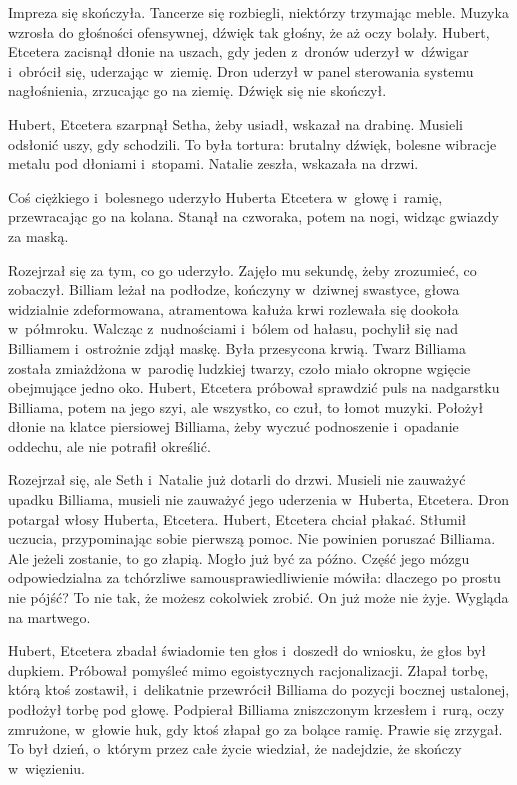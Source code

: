 \documentclass[oneside,polish,11pt,sfheadings]{mwbk}
\begin{document}
Impreza się skończyła. Tancerze się rozbiegli, niektórzy trzymając
meble. Muzyka wzrosła do głośności ofensywnej, dźwięk tak głośny, że aż
oczy bolały. Hubert, Etcetera zacisnął dłonie na uszach, gdy jeden z~dronów uderzył w~dźwigar i~obrócił się, uderzając w~ziemię. Dron uderzył
w panel sterowania systemu nagłośnienia, zrzucając go na ziemię. Dźwięk
się nie skończył.

Hubert, Etcetera szarpnął Setha, żeby usiadł, wskazał na drabinę.
Musieli odsłonić uszy, gdy schodzili. To była tortura: brutalny dźwięk,
bolesne wibracje metalu pod dłoniami i~stopami. Natalie zeszła, wskazała
na drzwi.

Coś ciężkiego i~bolesnego uderzyło Huberta Etcetera w~głowę i~ramię,
przewracając go na kolana. Stanął na czworaka, potem na nogi, widząc
gwiazdy za maską.

Rozejrzał się za tym, co go uderzyło. Zajęło mu sekundę, żeby zrozumieć,
co zobaczył. Billiam leżał na podłodze, kończyny w~dziwnej swastyce,
głowa widzialnie zdeformowana, atramentowa kałuża krwi rozlewała się
dookoła w~półmroku. Walcząc z~nudnościami i~bólem od hałasu, pochylił
się nad Billiamem i~ostrożnie zdjął maskę. Była przesycona krwią. Twarz
Billiama została zmiażdżona w~parodię ludzkiej twarzy, czoło miało
okropne wgięcie obejmujące jedno oko. Hubert, Etcetera próbował
sprawdzić puls na nadgarstku Billiama, potem na jego szyi, ale wszystko,
co czuł, to łomot muzyki. Położył dłonie na klatce piersiowej Billiama,
żeby wyczuć podnoszenie i~opadanie oddechu, ale nie potrafił określić.

Rozejrzał się, ale Seth i~Natalie już dotarli do drzwi. Musieli nie
zauważyć upadku Billiama, musieli nie zauważyć jego uderzenia w~Huberta,
Etcetera. Dron potargał włosy Huberta, Etcetera. Hubert, Etcetera chciał
płakać. Stłumił uczucia, przypominając sobie pierwszą pomoc. Nie
powinien poruszać Billiama. Ale jeżeli zostanie, to go złapią. Mogło już
być za późno. Część jego mózgu odpowiedzialna za tchórzliwe
samousprawiedliwienie mówiła: dlaczego po prostu nie pójść? To nie tak,
że możesz cokolwiek zrobić. On już może nie żyje. Wygląda na martwego.

Hubert, Etcetera zbadał świadomie ten głos i~doszedł do wniosku, że głos
był dupkiem. Próbował pomyśleć mimo egoistycznych racjonalizacji. Złapał
torbę, którą ktoś zostawił, i~delikatnie przewrócił Billiama do pozycji
bocznej ustalonej, podłożył torbę pod głowę. Podpierał Billiama
zniszczonym krzesłem i~rurą, oczy zmrużone, w~głowie huk, gdy ktoś
złapał go za bolące ramię. Prawie się zrzygał. To był dzień, o~którym
przez całe życie wiedział, że nadejdzie, że skończy w~więzieniu.
\end{document}
